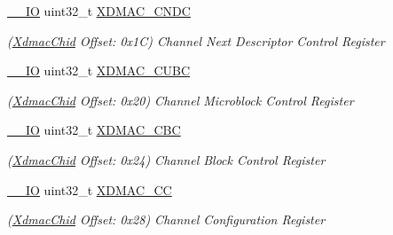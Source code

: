 \begin{DoxyCompactItemize}
\mbox{\label{structXdmacChid_ab6a8a3cc36aa7c26bd124fea6c26ee41}} 
\mbox{\hyperlink{core__cm7_8h_aec43007d9998a0a0e01faede4133d6be}{\+\_\+\+\_\+\+IO}} uint32\+\_\+t \mbox{\hyperlink{structXdmacChid_ab6a8a3cc36aa7c26bd124fea6c26ee41}{X\+D\+M\+A\+C\+\_\+\+C\+N\+DC}}
\begin{DoxyCompactList}\small\item\em (\mbox{\hyperlink{structXdmacChid}{Xdmac\+Chid}} Offset\+: 0x1C) Channel Next Descriptor Control Register \end{DoxyCompactList}\item 
\mbox{\label{structXdmacChid_a769a4033d99e6a45b5b9e560d3e77f17}} 
\mbox{\hyperlink{core__cm7_8h_aec43007d9998a0a0e01faede4133d6be}{\+\_\+\+\_\+\+IO}} uint32\+\_\+t \mbox{\hyperlink{structXdmacChid_a769a4033d99e6a45b5b9e560d3e77f17}{X\+D\+M\+A\+C\+\_\+\+C\+U\+BC}}
\begin{DoxyCompactList}\small\item\em (\mbox{\hyperlink{structXdmacChid}{Xdmac\+Chid}} Offset\+: 0x20) Channel Microblock Control Register \end{DoxyCompactList}\item 
\mbox{\label{structXdmacChid_a986a84a9ee00d34c1d74b04ee725b611}} 
\mbox{\hyperlink{core__cm7_8h_aec43007d9998a0a0e01faede4133d6be}{\+\_\+\+\_\+\+IO}} uint32\+\_\+t \mbox{\hyperlink{structXdmacChid_a986a84a9ee00d34c1d74b04ee725b611}{X\+D\+M\+A\+C\+\_\+\+C\+BC}}
\begin{DoxyCompactList}\small\item\em (\mbox{\hyperlink{structXdmacChid}{Xdmac\+Chid}} Offset\+: 0x24) Channel Block Control Register \end{DoxyCompactList}\item 
\mbox{\label{structXdmacChid_a40e50c30b41f380d7785357798c24064}} 
\mbox{\hyperlink{core__cm7_8h_aec43007d9998a0a0e01faede4133d6be}{\+\_\+\+\_\+\+IO}} uint32\+\_\+t \mbox{\hyperlink{structXdmacChid_a40e50c30b41f380d7785357798c24064}{X\+D\+M\+A\+C\+\_\+\+CC}}
\begin{DoxyCompactList}\small\item\em (\mbox{\hyperlink{structXdmacChid}{Xdmac\+Chid}} Offset\+: 0x28) Channel Configuration Register \end{DoxyCompactList}\item 

\end{DoxyCompactItemize}
